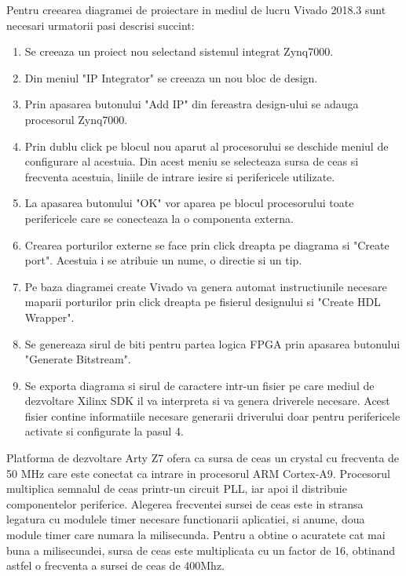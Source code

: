 Pentru creearea diagramei de proiectare in mediul de lucru Vivado 2018.3 sunt necesari urmatorii pasi descrisi succint:
\begin{enumerate}
	\item Se creeaza un proiect nou selectand sistemul integrat Zynq7000.
	\item Din meniul "IP Integrator" se creeaza un nou bloc de design.
	\item Prin apasarea butonului "Add IP" din fereastra design-ului se adauga procesorul Zynq7000.
	\item Prin dublu click pe blocul nou aparut al procesorului se deschide meniul de configurare al acestuia. Din acest meniu se selecteaza sursa de ceas si frecventa 
	acestuia, liniile de intrare iesire si perifericele utilizate.
    \item La apasarea butonului "OK" vor aparea pe blocul procesorului toate perifericele care se conecteaza la o componenta externa.
    \item Crearea porturilor externe se face prin click dreapta pe diagrama si "Create port". Acestuia i se atribuie un nume, o directie si un tip.
    \item Pe baza diagramei create Vivado va genera automat instructiunile necesare maparii porturilor prin click dreapta pe fisierul designului si "Create HDL Wrapper".
    \item Se genereaza sirul de biti pentru partea logica FPGA prin apasarea butonului "Generate Bitstream".
    \item Se exporta diagrama si sirul de caractere intr-un fisier pe care mediul de dezvoltare Xilinx SDK il va interpreta si va genera driverele necesare. Acest 
    fisier contine informatiile necesare generarii driverului doar pentru perifericele activate si configurate la pasul 4.
\end{enumerate}

Platforma de dezvoltare Arty Z7 ofera ca sursa de ceas un crystal cu frecventa de 50 MHz care este conectat ca intrare in procesorul ARM Cortex-A9. Procesorul multiplica 
semnalul de ceas printr-un circuit PLL, iar apoi il distribuie componentelor periferice. Alegerea frecventei sursei de ceas este in stransa legatura cu modulele timer 
necesare functionarii aplicatiei, si anume, doua module timer care numara la milisecunda. Pentru a obtine o acuratete cat mai buna a milisecundei, sursa de ceas este 
multiplicata cu un factor de 16, obtinand astfel o frecventa a sursei de ceas de 400Mhz.

